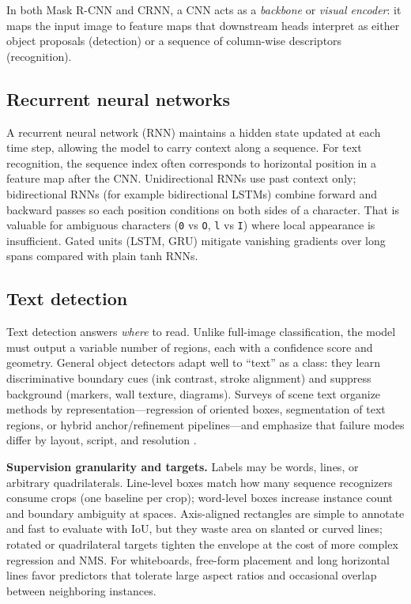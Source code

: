 \documentclass[11pt, a4paper]{article}
\begin{document}
In both Mask R-CNN and CRNN, a CNN acts as a \emph{backbone} or \emph{visual encoder}: it maps the input image to feature maps that downstream heads interpret as either object proposals (detection) or a sequence of column-wise descriptors (recognition).

\subsection{Recurrent neural networks}
A recurrent neural network (RNN) maintains a hidden state updated at each time step, allowing the model to carry context along a sequence. For text recognition, the sequence index often corresponds to horizontal position in a feature map after the CNN. Unidirectional RNNs use past context only; bidirectional RNNs (for example bidirectional LSTMs) combine forward and backward passes so each position conditions on both sides of a character. That is valuable for ambiguous characters (\texttt{0} vs \texttt{O}, \texttt{l} vs \texttt{I}) where local appearance is insufficient. Gated units (LSTM, GRU) mitigate vanishing gradients over long spans compared with plain tanh RNNs.

\subsection{Text detection}
Text detection answers \emph{where} to read. Unlike full-image classification, the model must output a variable number of regions, each with a confidence score and geometry. General object detectors adapt well to ``text'' as a class: they learn discriminative boundary cues (ink contrast, stroke alignment) and suppress background (markers, wall texture, diagrams). Surveys of scene text organize methods by representation---regression of oriented boxes, segmentation of text regions, or hybrid anchor/refinement pipelines---and emphasize that failure modes differ by layout, script, and resolution \cite{long2021survey}.

\textbf{Supervision granularity and targets.} Labels may be words, lines, or arbitrary quadrilaterals. Line-level boxes match how many sequence recognizers consume crops (one baseline per crop); word-level boxes increase instance count and boundary ambiguity at spaces. Axis-aligned rectangles are simple to annotate and fast to evaluate with IoU, but they waste area on slanted or curved lines; rotated or quadrilateral targets tighten the envelope at the cost of more complex regression and NMS. For whiteboards, free-form placement and long horizontal lines favor predictors that tolerate large aspect ratios and occasional overlap between neighboring instances.
\end{document}
